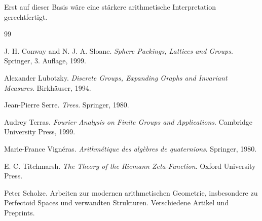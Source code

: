 \documentclass[12pt,a4paper]{article}
\theoremstyle{definition}
\begin{document}
	Erst auf dieser Basis wäre eine stärkere arithmetische Interpretation gerechtfertigt.
	
	\begin{thebibliography}{99}
		
		J. H. Conway and N. J. A. Sloane.
		\newblock \textit{Sphere Packings, Lattices and Groups}.
		\newblock Springer, 3. Auflage, 1999.
		
		Alexander Lubotzky.
		\newblock \textit{Discrete Groups, Expanding Graphs and Invariant Measures}.
		\newblock Birkhäuser, 1994.
		
		Jean-Pierre Serre.
		\newblock \textit{Trees}.
		\newblock Springer, 1980.
		
		Audrey Terras.
		\newblock \textit{Fourier Analysis on Finite Groups and Applications}.
		\newblock Cambridge University Press, 1999.
		
		Marie-France Vignéras.
		\newblock \textit{Arithmétique des algèbres de quaternions}.
		\newblock Springer, 1980.
		
		E. C. Titchmarsh.
		\newblock \textit{The Theory of the Riemann Zeta-Function}.
		\newblock Oxford University Press.
		
		Peter Scholze.
		\newblock Arbeiten zur modernen arithmetischen Geometrie, insbesondere zu Perfectoid Spaces und verwandten Strukturen.
		\newblock Verschiedene Artikel und Preprints.
		
	\end{thebibliography}
	
\end{document}

